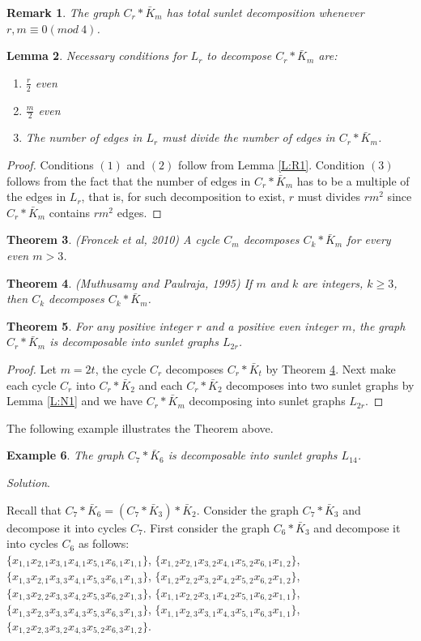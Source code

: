 \documentclass[12pt]{report}
\newcommand{\ben}{\begin{enumerate}}
\newcommand{\een}{\end{enumerate}}
\newtheorem{thm}{Theorem}[section]
\newtheorem{lem}[thm]{Lemma}
\newtheorem{rem}[thm]{Remark}
\newtheorem{exm}[thm]{Example}
\begin{document}
 \begin{rem}
{\rm The graph $C_r*\bar{K}_m$ has total sunlet decomposition
whenever $r,m\equiv 0(mod \ 4)$}.
\end{rem}
  \begin{lem}
 Necessary conditions for $L_r$ to decompose $C_r*\bar{K}_m$ are:
 \ben
 \item $\frac{r}{2}$ even
 \item $\frac{m}{2}$ even
 \item The number of edges in $L_r$ must divide the number of edges in $C_r*\bar{K}_m$.
 \een
 \end{lem}
 \begin{proof}
 Conditions $(1)$ and $(2)$ follow from Lemma \ref{L:R1}. Condition $(3)$ follows from the fact that the number of edges in $C_r*\bar{K}_m$ has to be a multiple of the edges in $L_r$, that is, for such decomposition to exist, $r$ must divides $rm^2$ since $C_r*\bar{K}_m$ contains $rm^2$ edges.
 \end{proof}
 \begin{thm}\label{T:FR1}(Froncek  et al, 2010) %
  A cycle $C_m$ decomposes $C_k*\bar{K}_m$ for every even $m> 3$.
 \end{thm}
 \begin{thm}\label{T:MT1}(Muthusamy and Paulraja, 1995) %
 If $m$ and $k$ are integers, $k\geq 3$, then $C_k$ decomposes
$C_k*\bar{K}_m$.
\end{thm}

\begin{thm}
For any positive integer $r$ and a positive even integer $m$, the
 graph $C_r*\bar{K}_m$ is decomposable into sunlet graphs $L_{2r}$.
\end{thm}
\begin{proof}
Let $m=2t$, the cycle $C_r$ decomposes $C_r*\bar{K}_t$ by Theorem
\ref{T:MT1}. Next make each cycle $C_r$ into $C_r*\bar{K}_2$ and
each $C_r*\bar{K}_2$ decomposes into two sunlet graphs by Lemma
\ref{L:N1} and we have $C_r*\bar{K}_m$ decomposing into sunlet
graphs $L_{2r}$.
\end{proof}
The following example illustrates the Theorem above.
\begin{exm}
The graph $C_7*\bar{K}_6$ is decomposable into sunlet graphs
$L_{14}$.
\end{exm}
{\em Solution}.

Recall that $C_7*\bar{K}_6=(C_7*\bar{K}_3)*\bar{K}_2$. Consider the
graph $C_7*\bar{K}_3$ and decompose it into cycles $C_7$. First
consider the graph $C_6*\bar{K}_3$ and decompose it into cycles
$C_6$ as follows:\\
$\{x_{1,1}x_{2,1}x_{3,1}x_{4,1}x_{5,1}x_{6,1}x_{1,1}\}$,
$\{x_{1,2}x_{2,1}x_{3,2}x_{4,1}x_{5,2}x_{6,1}x_{1,2}\}$,
$\{x_{1,3}x_{2,1}x_{3,3}x_{4,1}x_{5,3}x_{6,1}x_{1,3}\}$,
$\{x_{1,2}x_{2,2}x_{3,2}x_{4,2}x_{5,2}x_{6,2}x_{1,2}\}$,
$\{x_{1,3}x_{2,2}x_{3,3}x_{4,2}x_{5,3}x_{6,2}x_{1,3}\}$,
$\{x_{1,1}x_{2,2}x_{3,1}x_{4,2}x_{5,1}x_{6,2}x_{1,1}\}$,
$\{x_{1,3}x_{2,3}x_{3,3}x_{4,3}x_{5,3}x_{6,3}x_{1,3}\}$,
$\{x_{1,1}x_{2,3}x_{3,1}x_{4,3}x_{5,1}x_{6,3}x_{1,1}\}$,
$\{x_{1,2}x_{2,3}x_{3,2}x_{4,3}x_{5,2}x_{6,3}x_{1,2}\}$.
\end{document}
